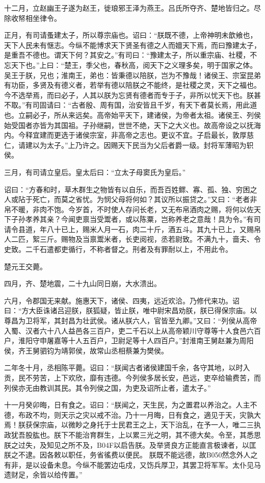 \documentclass[]{article}
\begin{document}
十二月，立赵幽王子遂为赵王，徙琅邪王泽为燕王。吕氏所夺齐、楚地皆归之。尽除收帑相坐律令。

正月，有司请蚤建太子，所以尊宗庙也。诏曰：``朕既不德，上帝神明未歆飨也，天下人民未有惬志。今纵不能博求天下贤圣有德之人而嬗天下焉，而曰豫建太子，是重吾不德也。谓天下何？其安之。''有司曰：``豫建太子，所以重宗庙、社稷，不忘天下也。''上曰：``楚王，季父也，春秋高，阅天下之义理多矣，明于国家之体。吴王于朕，兄也；淮南王，弟也：皆秉德以陪朕，岂为不豫哉！诸侯王、宗室昆弟有功臣，多贤及有德义者，若举有德以陪朕之不能终，是社稷之灵，天下之福也。今不选举焉，而曰必子，人其以朕为忘贤有德者而专于子，非所以忧天下也。朕甚不取。''有司固请曰：``古者殷、周有国，治安皆且千岁，有天下者莫长焉，用此道也。立嗣必子，所从来远矣。高帝始平天下，建诸侯，为帝者太祖。诸侯王、列侯始受国者亦皆为其国祖。子孙继嗣，世世不绝，天下之大义也。故高帝设之以抚海内。今释宜建而更选于诸侯宗室，非高帝之志也。更议不宜。子启最长，敦厚慈仁，请建以为太子。''上乃许之。因赐天下民当为父后者爵一级。封将军薄昭为轵侯。

三月，有司请立皇后。皇太后曰：``立太子母窦氏为皇后。''

诏曰：``方春和时，草木群生之物皆有以自乐，而吾百姓鳏、寡、孤、独、穷困之人或阽于死亡，而莫之省忧。为悯父母将何如？其议所以振贷之。''又曰：``老者非帛不暖，非肉不饱。今岁首，不时使人存问长老，又无布帛酒肉之赐，将何以佐天下子孙孝养其亲？今闻吏禀当受鬻者，或以陈粟，岂称养老之意哉！具为令。''有司请令县道，年八十已上，赐米人月一石，肉二十斤，酒五斗。其九十已上，又赐帛人二匹，絮三斤。赐物及当禀鬻米者，长吏阅视，丞若尉致。不满九十，啬夫、令史致。二千石遣都吏循行，不称者督之。刑者及有罪耐以上，不用此令。

楚元王交薨。

四月，齐、楚地震，二十九山同日崩，大水溃出。

六月，令郡国无来献。施惠天下，诸侯、四夷，远近欢洽。乃修代来功。诏曰：``方大臣诛诸吕迎朕，朕狐疑，皆止朕，唯中尉宋昌劝朕，朕已得保宗庙。以尊昌为卫将军，其封昌为壮武侯。诸从朕六人，官皆至九卿。''又曰：``列侯从高帝入蜀、汉者六十八人益邑各三百户，吏二千石以上从高帝颖川守尊等十人食邑六百户，淮阳守申屠嘉等十人五百户，卫尉足等十人四百户。''封淮南王舅赵兼为周阳侯，齐王舅驷钧为靖郭侯，故常山丞相蔡兼为樊侯。

二年冬十月，丞相陈平薨。诏曰：``朕闻古者诸侯建国千余，各守其地，以时入贡，民不劳苦，上下欢欣，靡有违德。今列侯多居长安，邑远，吏卒给输费苦，而列侯亦无由教训其民。其令列侯之国，为吏及诏所止者，遣太子。''

十一月癸卯晦，日有食之。诏曰：``朕闻之，天生民，为之置君以养治之。人主不德，布政不均，则天示之灾以戒不治。乃十一月晦，日有食之，適见于天，灾孰大焉！朕获保宗庙，以微眇之身托于士民君王之上，天下治乱，在予一人，唯二三执政犹吾股肱也。朕下不能治育群生，上以累三光之明，其不德大矣。令至，其悉思朕之过失，及知见之所不及，B04F以启告朕。及举贤良方正能直言极谏者，以匡朕之不逮。因各敕以职任，务省徭费以便民。
朕既不能远德，故B050然念外人之有非，是以设备未息。今纵不能罢边屯戍，又饬兵厚卫，其罢卫将军军。太仆见马遗财足，余皆以给传置。''
\end{document}
